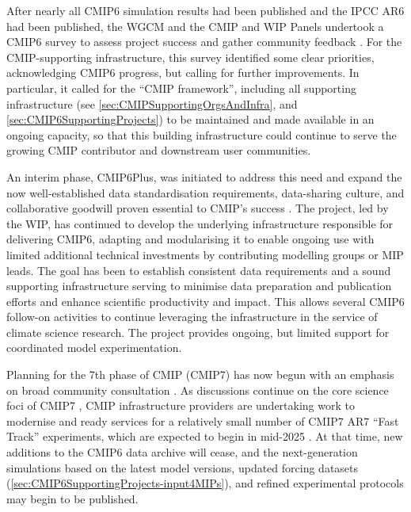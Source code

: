 \documentclass[manuscript]{copernicus}
\begin{document}
After nearly all CMIP6 simulation results had been published and the IPCC AR6 had been published, the WGCM and the CMIP and WIP Panels undertook a CMIP6 survey to assess project success and gather community feedback \citep{orourke_cmip6_2024}. For the CMIP-supporting infrastructure, this survey identified some clear priorities, acknowledging CMIP6 progress, but calling for further improvements. In particular, it called for the ``CMIP framework'', including all supporting infrastructure (see \autoref{sec:CMIPSupportingOrgsAndInfra}, and \autoref{sec:CMIP6SupportingProjects}) to be maintained and made available in an ongoing capacity, so that this building infrastructure could continue to serve the growing CMIP contributor and downstream user communities.

An interim phase, CMIP6Plus, was initiated to address this need and expand the now well-established data standardisation requirements, data-sharing culture, and collaborative goodwill proven essential to CMIP's success \citep{mizielinski_cmip6plus_2024}. The project, led by the WIP, has continued to develop the underlying infrastructure responsible for delivering CMIP6, adapting and modularising it to enable ongoing use with limited additional technical investments by contributing modelling groups or MIP leads. The goal has been to establish consistent data requirements and a sound supporting infrastructure serving to minimise data preparation and publication efforts and enhance scientific productivity and impact. This allows several CMIP6 follow-on activities to continue leveraging the infrastructure in the service of climate science research. The project provides ongoing, but limited support for coordinated model experimentation.

Planning for the 7th phase of CMIP (CMIP7) has now begun with an emphasis on broad community consultation \citep{orourke_cmip6_2024}. As discussions continue on the core science foci of CMIP7 \citep[e.g.,][]{dunne_climate_2023,dunne_evolving_2024-1}, CMIP infrastructure providers are undertaking work \citep[e.g.,][]{kershaw_esgf_2020} to modernise and ready services for a relatively small number of CMIP7 AR7 ``Fast Track'' experiments, which are expected to begin in mid-2025 \citep{dunne_evolving_2024-1}. At that time, new additions to the CMIP6 data archive will cease, and the next-generation simulations based on the latest model versions, updated forcing datasets (\autoref{sec:CMIP6SupportingProjects-input4MIPs}), and refined experimental protocols may begin to be published.
\end{document}
